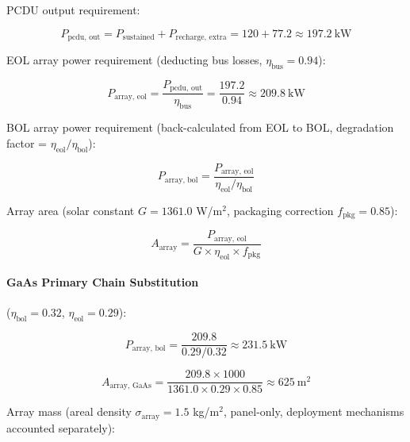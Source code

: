 PCDU output requirement:

\begin{equation}
  P_{\text{pcdu, out}} = P_{\text{sustained}} + P_{\text{recharge, extra}}
                         = 120 + 77.2 \approx 197.2\ \text{kW}
  \label{eq:pcdu-out}
\end{equation}

EOL array power requirement (deducting bus losses, $\eta_{\text{bus}} = 0.94$):

\begin{equation}
  P_{\text{array, eol}} = \frac{P_{\text{pcdu, out}}}{\eta_{\text{bus}}}
                          = \frac{197.2}{0.94} \approx 209.8\ \text{kW}
  \label{eq:array-eol-power}
\end{equation}

BOL array power requirement (back-calculated from EOL to BOL, degradation factor = $\eta_{\text{eol}}/\eta_{\text{bol}}$):

\begin{equation}
  P_{\text{array, bol}} = \frac{P_{\text{array, eol}}}{\eta_{\text{eol}}/\eta_{\text{bol}}}
  \label{eq:array-bol-power}
\end{equation}

Array area (solar constant $G = 1361.0$ W/m$^2$, packaging correction $f_{\text{pkg}} = 0.85$):

\begin{equation}
  A_{\text{array}} = \frac{P_{\text{array, eol}}}{G \times \eta_{\text{eol}} \times f_{\text{pkg}}}
  \label{eq:array-area}
\end{equation}

\paragraph{GaAs Primary Chain Substitution} ($\eta_{\text{bol}} = 0.32$, $\eta_{\text{eol}} = 0.29$):

\begin{equation}
  P_{\text{array, bol}} = \frac{209.8}{0.29/0.32} \approx 231.5\ \text{kW}
\end{equation}

\begin{equation}
  A_{\text{array, GaAs}} = \frac{209.8 \times 1000}{1361.0 \times 0.29 \times 0.85} \approx 625\ \text{m}^{2}
\end{equation}

Array mass (areal density $\sigma_{\text{array}} = 1.5$ kg/m$^2$, panel-only, deployment mechanisms accounted separately):

